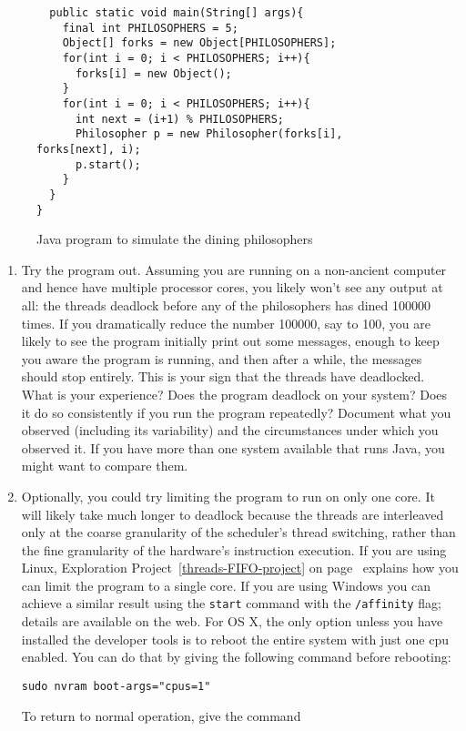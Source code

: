 \begin{chapterEnumerate}
\begin{figure}
\begin{verbatim}
  public static void main(String[] args){
    final int PHILOSOPHERS = 5;
    Object[] forks = new Object[PHILOSOPHERS];
    for(int i = 0; i < PHILOSOPHERS; i++){
      forks[i] = new Object();
    }
    for(int i = 0; i < PHILOSOPHERS; i++){
      int next = (i+1) % PHILOSOPHERS;
      Philosopher p = new Philosopher(forks[i], forks[next], i);
      p.start();
    }
  }
}
\end{verbatim}
\caption{Java program to simulate the dining
  philosophers}\label{dining-philosophers-code}
\end{figure}
\begin{enumerate}
\item
Try the program out.
Assuming you are running on a non-ancient computer
and hence have multiple processor cores, you likely
won't see any output at all: the threads deadlock
before any of the philosophers has dined 100000 times.
If you dramatically reduce the number 100000, say to 100,
you are likely to see the program initially print out
some messages, enough to
keep you aware the program is running, and then after a
while, the messages should stop entirely.  This is your sign that the
threads have deadlocked.  What is your experience?  Does the program
deadlock on your system?  Does it do so consistently if you run the
program repeatedly?  Document what you observed (including its
variability) and the circumstances under which you observed it.  If
you have more than one system available that runs Java, you might want
to compare them.
\item
Optionally, you could try limiting the program to run on only one core. It will likely
take much longer to deadlock because the threads are interleaved
only at the coarse granularity of the scheduler's thread switching, rather than the
fine granularity of the hardware's instruction execution.
If you are using Linux,
Exploration
Project~\ref{threads-FIFO-project} on page~\pageref{threads-FIFO-project}
explains how you can limit the program to a single core.
If you are using Windows you can achieve a similar result using
the \texttt{start} command with the \texttt{/affinity} flag; details
are available on the web. For OS X, the only option unless you
have installed the developer tools is to reboot the entire system
with just one cpu enabled. You can do that by giving the following command
before rebooting:
\begin{verbatim}
sudo nvram boot-args="cpus=1"
\end{verbatim}
To return to normal operation, give the command
\begin{verbatim}

\end{verbatim}
\end{enumerate}
\end{chapterEnumerate}
